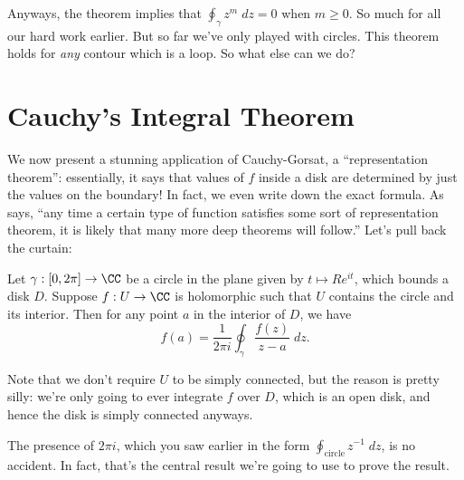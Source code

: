Anyways, the theorem implies that $\oint_\gamma z^m \; dz = 0$ when $m \ge 0$.
So much for all our hard work earlier.
But so far we've only played with circles.
This theorem holds for \emph{any} contour which is a loop.
So what else can we do?

\section{Cauchy's Integral Theorem}
We now present a stunning application of Cauchy-Gorsat, a ``representation theorem'':
essentially, it says that values of $f$ inside a disk
are determined by just the values on the boundary!
In fact, we even write down the exact formula.
As \cite{ref:dartmouth} says,
``any time a certain type of function satisfies some sort of representation theorem,
it is likely that many more deep theorems will follow.''
Let's pull back the curtain:

\begin{theorem}
	Let $\gamma : [0,2\pi] \to \CC$ be a circle in the plane given by $t \mapsto Re^{it}$,
	which bounds a disk $D$.
	Suppose $f : U \to \CC$ is holomorphic such that $U$ contains the circle and its interior.
	Then for any point $a$ in the interior of $D$, we have
	\[ 
		f(a)
		=
		\frac{1}{2\pi i} \oint_\gamma \frac{f(z)}{z-a} \; dz.
	\]
\end{theorem}
Note that we don't require $U$ to be simply connected, but the reason is pretty silly:
we're only going to ever integrate $f$ over $D$, which is an open disk, and hence the disk
is simply connected anyways.

The presence of $2\pi i$, which you saw earlier in the form $\oint_{\text{circle}} z^{-1} \; dz$,
is no accident.
In fact, that's the central result we're going to use to prove the result.

